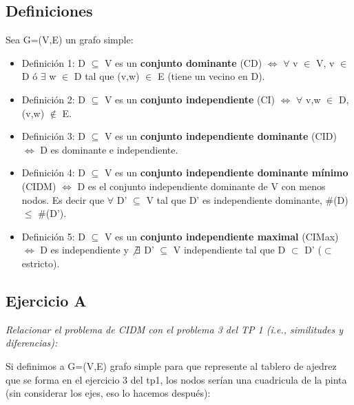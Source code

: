 \subsection{Definiciones}

Sea G=(V,E) un grafo simple:

\begin{itemize}
\item Definición 1: D $\subseteq$ V es un \textbf{conjunto dominante} (CD) $\iff$ $\forall$ v $\in$ V, v $\in$ D ó $\exists$ w $\in$ D tal que (v,w) $\in$ E (tiene un vecino en D).
\item Definición 2: D $\subseteq$ V es un \textbf{conjunto independiente} (CI) $\iff$ $\forall$ v,w $\in$ D, (v,w) $\not\in$ E.
\item Definición 3: D $\subseteq$ V es un \textbf{conjunto independiente dominante} (CID) $\iff$ D es dominante e independiente.
\item Definición 4: D $\subseteq$ V es un \textbf{conjunto independiente dominante mínimo} (CIDM) $\iff$ D es el conjunto independiente dominante de V con menos nodos. Es decir que $\forall$ D' $\subseteq$ V tal que D' es independiente dominante, \#(D) $\leq$ \#(D').
\item Definición 5: D $\subseteq$ V es un \textbf{conjunto independiente maximal} (CIMax) $\iff$ D es independiente y $\not\exists$ D' $\subseteq$ V independiente tal que D $\subset$ D' ($\subset$ estricto).
\end{itemize}

\subsection{Ejercicio A}

\textit{Relacionar el problema de CIDM con el problema 3 del TP 1 (i.e., similitudes y diferencias):}

\medskip

Si definimos a G=(V,E) grafo simple para que represente al tablero de ajedrez que se forma en el ejercicio 3 del tp1, los nodos serían una cuadricula de la pinta (sin considerar los ejes, eso lo hacemos después):

